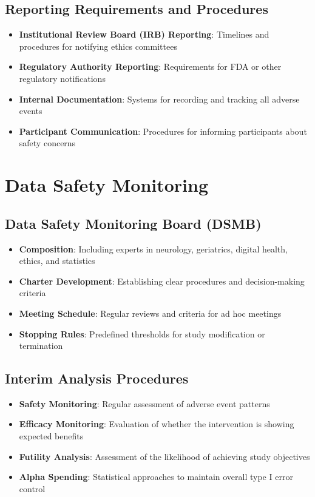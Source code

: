 \subsection{Reporting Requirements and Procedures}
\begin{itemize}
    \item \textbf{Institutional Review Board (IRB) Reporting}: Timelines and procedures for notifying ethics committees
    
    \item \textbf{Regulatory Authority Reporting}: Requirements for FDA or other regulatory notifications
    
    \item \textbf{Internal Documentation}: Systems for recording and tracking all adverse events
    
    \item \textbf{Participant Communication}: Procedures for informing participants about safety concerns
\end{itemize}

\section{Data Safety Monitoring}
\subsection{Data Safety Monitoring Board (DSMB)}
\begin{itemize}
    \item \textbf{Composition}: Including experts in neurology, geriatrics, digital health, ethics, and statistics
    
    \item \textbf{Charter Development}: Establishing clear procedures and decision-making criteria
    
    \item \textbf{Meeting Schedule}: Regular reviews and criteria for ad hoc meetings
    
    \item \textbf{Stopping Rules}: Predefined thresholds for study modification or termination
\end{itemize}

\subsection{Interim Analysis Procedures}
\begin{itemize}
    \item \textbf{Safety Monitoring}: Regular assessment of adverse event patterns
    
    \item \textbf{Efficacy Monitoring}: Evaluation of whether the intervention is showing expected benefits
    
    \item \textbf{Futility Analysis}: Assessment of the likelihood of achieving study objectives
    
    \item \textbf{Alpha Spending}: Statistical approaches to maintain overall type I error control
\end{itemize}

